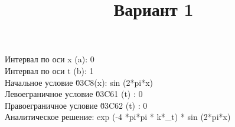 \documentclass{article}
\title{Вариант 1}
\author{}
\date{}
\begin{document}
\maketitle

Интервал по оси x (a): 0 \\
Интервал по оси t (b): 1 \\
Начальное условие \u03C8(x): sin (2*pi*x) \\
Левое\n граничное условие \u03C61 (t) : 0 \\
Правое\n граничное условие \u03C62 (t) : 0 \\
Аналитическое решение: exp (-4 *pi*pi * k*_t) * sin (2*pi*x)
\end{document}
